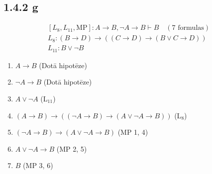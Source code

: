 \documentclass{article}
\begin{document}
\subsection{1.4.2 g}

\[
    \begin{array}{l}
        [L_8, L_{11}, \text{MP}]: A \rightarrow B, \neg A \rightarrow B \vdash B \quad (7 \text{ formulas}) \\
        L_8: (B \rightarrow D) \rightarrow ((C \rightarrow D) \rightarrow (B \lor C \rightarrow D))         \\
        L_{11}: B \lor \neg B
    \end{array}
\]

\begin{enumerate}
    \item $A \rightarrow B$ \hfill (Dotā hipotēze)
    \item $\neg A \rightarrow B$ \hfill (Dotā hipotēze)
    \item $A \lor \neg A$ \hfill (L$_{11}$)
    \item $(A \rightarrow B) \rightarrow ((\neg A \rightarrow B) \rightarrow (A \lor \neg A \rightarrow B))$ \hfill (L$_8$)
    \item $(\neg A \rightarrow B) \rightarrow (A \lor \neg A \rightarrow B)$ \hfill (MP 1, 4)
    \item $A \lor \neg A \rightarrow B$ \hfill (MP 2, 5)
    \item $B$ \hfill (MP 3, 6)
\end{enumerate}
\end{document}
